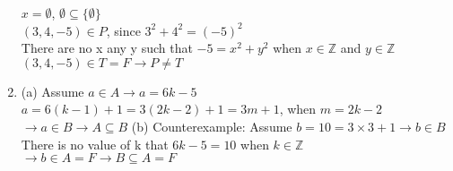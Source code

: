 \documentclass[12pt]{article}
\begin{document}
\begin{enumerate}
 $x=\emptyset$, $\emptyset \subseteq \{\emptyset\}$\\

$(3,4,-5) \in P$, since $3^{2}+4^{2}=(-5)^{2}$\\
There are no x any y such that $-5=x^{2}+y^{2}$ when $x \in \mathbb{Z}$ and $y \in \mathbb{Z}$\\
$(3,4,-5) \in T =F \to P \neq T$ \\

\item
\noindent (a) Assume $a \in A \to a=6k-5$\\
$a=6(k-1)+1=3(2k-2)+1=3m+1$, when $m=2k-2$\\
$\to a \in B \to A \subseteq B$
(b) Counterexample: Assume $b=10=3\times 3+1 \to b \in B$\\
There is no value of k that $6k-5=10$ when $k \in \mathbb{Z}$\\
$\to b \in A=F \to B \subseteq A=F$\\
\end{enumerate}
\end{document}
